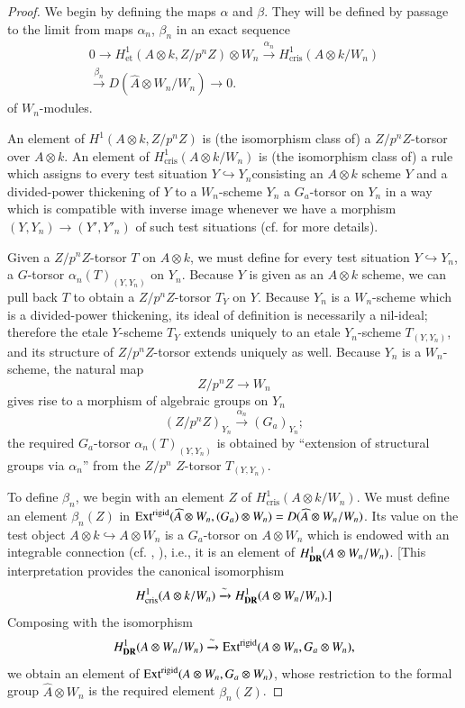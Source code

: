 \begin{proof}
We begin by defining the maps $\alpha$ and $\beta$. They will be defined by passage to the limit from maps $\alpha_{n}$, $\beta_{n}$ in an exact sequence
\begin{gather*}
0\to H^{1}_{\text{et}}(A\otimes k,Z/p^{n}Z)\otimes W_{n}\xrightarrow{\alpha_{n}}H^{1}_{\text{cris}}(A\otimes k/W_{n})\tag{5.7.2}\label{art6-eq5.7.2}\\
\xrightarrow{\beta_{n}}D(\widehat{A}\otimes W_{n}/W_{n})\to 0.
\end{gather*}
of $W_{n}$-modules.

An element of $H^{1}(A\otimes k, Z/p^{n}Z)$ is (the isomorphism class of) a $Z/p^{n}Z$-torsor over $A\otimes k$. An element of $H^{1}_{\text{cris}}(A\otimes k/W_{n})$ is (the isomorphism class of) a rule which assigns to every test situation $Y\hookrightarrow Y_{n}$\pageoriginale consisting an $A\otimes k$ scheme $Y$ and a divided-power thickening of $Y$ to a $W_{n}$-scheme $Y_{n}$ a $G_{a}$-torsor on $Y_{n}$ in a way which is compatible with inverse image whenever we have a morphism $(Y,Y_{n})\to (Y',Y'_{n})$ of such test situations (cf. \cite{art6-key35} for more details).

Given a $Z/p^{n}Z$-torsor $T$ on $A\otimes k$, we must define for every test situation $Y\hookrightarrow Y_{n}$, a $G$-torsor $\alpha_{n}(T)_{(Y,Y_{n})}$ on $Y_{n}$. Because $Y$ is given as an $A\otimes k$ scheme, we can pull back $T$ to obtain a $Z/p^{n}Z$-torsor $T_{Y}$ on $Y$. Because $Y_{n}$ is a $W_{n}$-scheme which is a divided-power thickening, its ideal of definition is necessarily a nil-ideal; therefore the etale $Y$-scheme $T_{Y}$ extends uniquely to an etale $Y_{n}$-scheme $T_{(Y,Y_{n})}$, and its structure of $Z/p^{n}Z$-torsor extends uniquely as well. Because $Y_{n}$ is a $W_{n}$-scheme, the natural map
$$
Z/p^{n}Z\to W_{n}
$$
gives rise to a morphism of algebraic groups on $Y_{n}$
$$
(Z/p^{n}Z)_{Y_{n}}\xrightarrow{\alpha_{n}}(G_{a})_{Y_{n}};
$$
the required $G_{a}$-torsor $\alpha_{n}(T)_{(Y,Y_{n})}$ is obtained by ``extension of structural groups via $\alpha_{n}$'' from the $Z/p^{n}$ $Z$-torsor $T_{(Y,Y_{n})}$.

To define $\beta_{n}$, we begin with an element $Z$ of $H^{1}_{\text{cris}}(A\otimes k/W_{n})$. We must define an element $\beta_{n}(Z)$ in $\operatorname{Ext}^{\text{rigid}}(\widehat{A}\otimes W_{n},(G_{a})\otimes W_{n})=D(\widehat{A}\otimes W_{n}/W_{n})$. Its value on the test object $A\otimes k\hookrightarrow A\otimes W_{n}$ is a $G_{a}$-torsor on $A\otimes W_{n}$ which is endowed with an integrable connection (cf. \cite{art6-key2}, \cite{art6-key3}), i.e., it is an element of $H^{1}_{\mathbf{DR}}(A\otimes W_{n}/W_{n})$. [This interpretation provides the canonical isomorphism
$$
H^{1}_{\text{cris}}(A\otimes k/W_{n})\xrightarrow{\sim}H^{1}_{\mathbf{DR}}(A\otimes W_{n}/W_{n}).]
$$
Composing with the isomorphism
$$
H^{1}_{\mathbf{DR}}(A\otimes W_{n}/W_{n})\xrightarrow{\sim}\operatorname{Ext}^{\text{rigid}}(A\otimes W_{n},G_{a}\otimes W_{n}),
$$
we obtain an element of $\operatorname{Ext}^{\text{rigid}}(A\otimes W_{n},G_{a}\otimes W_{n})$, whose restriction to the formal group $\widehat{A}\otimes W_{n}$ is the required element $\beta_{n}(Z)$.


\end{proof}
